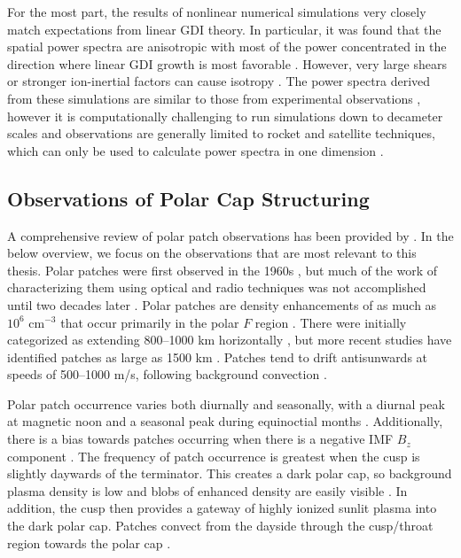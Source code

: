 For the most part, the results of nonlinear numerical simulations very closely match expectations from linear GDI theory.  In particular, it was found that the spatial power spectra are anisotropic with most of the power concentrated in the direction where linear GDI growth is most favorable \citep{Keskinen1981a,Keskinen1981b,Keskinen1982a,Gondarenko2001,Gondarenko2004b}.  However, very large shears or stronger ion-inertial factors can cause isotropy \citep{Gondarenko2001,Gondarenko2006}.  The power spectra derived from these simulations are similar to those from experimental observations \citep{Baker1978,Kelley1979}, however it is computationally challenging to run simulations down to decameter scales and observations are generally limited to rocket and satellite techniques, which can only be used to calculate power spectra in one dimension \citep{Villain1986,Moen2012}.


\subsection{Observations of Polar Cap Structuring}
\label{sec:lit_observations}
A comprehensive review of polar patch observations has been provided by \citet{Crowley1996}.  In the below overview, we focus on the observations that are most relevant to this thesis.  Polar patches were first observed in the 1960s \citep{Hill1963}, but much of the work of characterizing them using optical and radio techniques was not accomplished until two decades later \citep{Weber1981,Weber1984,Weber1986,Buchau1983,Buchau1985}.  Polar patches are density enhancements of as much as \(10^6\) cm\(^{-3}\) that occur primarily in the polar \(F\) region \citep{Buchau1983}.  There were initially categorized as extending 800--1000 km horizontally \citep{Weber1984}, but more recent studies have identified patches as large as 1500 km \citep{Hosokawa2014}.  Patches tend to drift antisunwards at speeds of 500--1000 m/s, following background convection \citep{Buchau1983,Weber1984}.

Polar patch occurrence varies both diurnally and seasonally, with a diurnal peak at magnetic noon and a seasonal peak during equinoctial months \citep{Rodger1996}.  Additionally, there is a bias towards patches occurring when there is a negative IMF \(B_z\) component \citep{Buchau1983,Rodger1996}.  The frequency of patch occurrence is greatest when the cusp is slightly daywards of the terminator.  This creates a dark polar cap, so background plasma density is low and blobs of enhanced density are easily visible \citep{Coley1998}.  In addition, the cusp then provides a gateway of highly ionized sunlit plasma into the dark polar cap.  Patches convect from the dayside through the cusp/throat region towards the polar cap \citep{Kelly1984,Foster1984,Foster1985,Foster1993,Sojka1982,delaBeaujardiere1985}.

